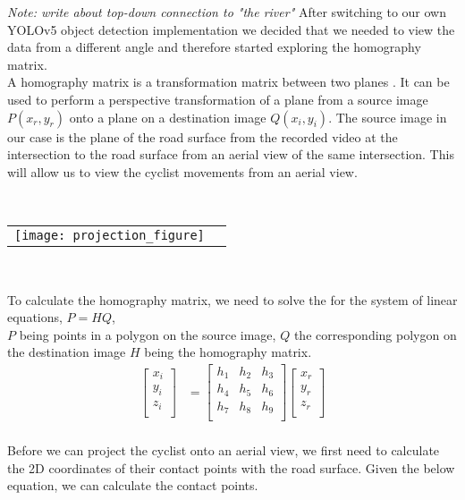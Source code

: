 \textit{Note: write about top-down connection to "the river"}
After switching to our own YOLOv5 object detection implementation we decided that we needed to view the data from a different angle and therefore
started exploring the homography matrix.
\ \\
A homography matrix is a transformation matrix between two planes \cite{hartley_zisserman_2004}. It can be used to perform a perspective transformation of a plane from a source image $P(x_r, y_r)$ onto a plane on a destination image $Q(x_i, y_i)$.
The source image in our case is the plane of the road surface from the recorded video at the intersection to the road surface from an aerial view of the same intersection. 
This will allow us to view the cyclist movements from an aerial view.

\ \\ 
\noindent
\begin{tabular}{@{}cc}
\texttt{[image: projection\_figure]} 
\end{tabular}
\label{projection_figure}
\

To calculate the homography matrix, we need to solve the for the system of linear equations, $P = HQ$,
\ \\
$P$ being points in a polygon on the source image, $Q$ the corresponding polygon on the destination image $H$ being the homography matrix.
\begin{align}
\label{eq:3}
  \begin{bmatrix}
    x_{i} \\
    y_{i} \\
    z_{i} \\
  \end{bmatrix}
  &= \begin{bmatrix}
      h_1 & h_2 & h_3 \\
      h_4 & h_5 & h_6 \\
      h_7 & h_8 & h_9 \\
  \end{bmatrix}
  \begin{bmatrix}
    x_{r} \\
    y_{r} \\
    z_{r} \\
  \end{bmatrix}
\end{align}
\ \\

Before we can project the cyclist onto an aerial view, we first need to calculate the 2D coordinates of their contact points with the road surface.
Given the below equation, we can calculate the contact points.

